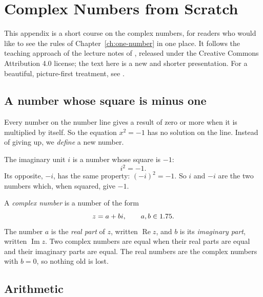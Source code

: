 \chapter{Complex Numbers from Scratch}\label{app:complex}

This appendix is a short course on the complex numbers, for readers who would like to see the rules of Chapter~\ref{ch:one-number} in one place. It follows the teaching approach of the lecture notes of \citet{MokhithiShock2020}, released under the Creative Commons Attribution 4.0 license; the text here is a new and shorter presentation. For a beautiful, picture-first treatment, see \citet{Needham1997}.

\section{A number whose square is minus one}\label{app:c-i}

Every number on the number line gives a result of zero or more when it is multiplied by itself. So the equation $x^2 = -1$ has no solution on the line. Instead of giving up, we \emph{define} a new number.

\begin{definition}\label{def:imaginary-unit}
The imaginary unit $i$ is a number whose square is $-1$:
\[
i^2 = -1 .
\]
Its opposite, $-i$, has the same property: $(-i)^2 = -1$. So $i$ and $-i$ are the two numbers which, when squared, give $-1$.
\end{definition}

A \emph{complex number} is a number of the form
\[
z = a + bi, \qquad a, b \in 1.75 .
\]
The number $a$ is the \emph{real part} of $z$, written $\operatorname{Re} z$, and $b$ is its \emph{imaginary part}, written $\operatorname{Im} z$. Two complex numbers are equal when their real parts are equal and their imaginary parts are equal. The real numbers are the complex numbers with $b = 0$, so nothing old is lost.

\section{Arithmetic}\label{app:c-arithmetic}

